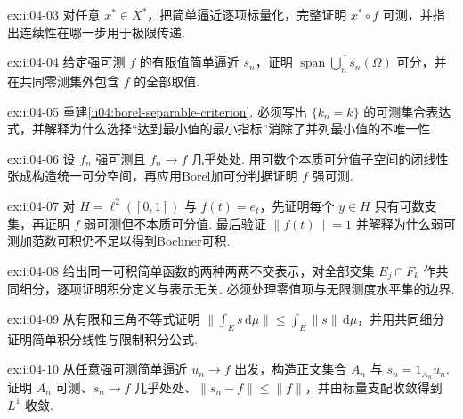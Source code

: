 \begin{FAExercise}[强可测推出弱可测]{ex:ii04-03}
对任意 \(\displaystyle x^*\in X^*\)，把简单逼近逐项标量化，完整证明 \(\displaystyle x^*\circ f\) 可测，并指出连续性在哪一步用于极限传递.
\end{FAExercise}

\begin{FAExercise}[本质可分值]{ex:ii04-04}
给定强可测 \(\displaystyle f\) 的有限值简单逼近 \(\displaystyle s_n\)，证明 \(\displaystyle\overline{\operatorname{span}\bigcup_ns_n(\Omega)}\) 可分，并在共同零测集外包含 \(\displaystyle f\) 的全部取值.
\end{FAExercise}

\begin{FAExercise}[Borel加可分判据]{ex:ii04-05}
重建\autoref{ii04:borel-separable-criterion}. 必须写出 \(\displaystyle\{k_n=k\}\) 的可测集合表达式，并解释为什么选择“达到最小值的最小指标”消除了并列最小值的不唯一性.
\end{FAExercise}

\begin{FAExercise}[强可测的几乎处处极限闭性]{ex:ii04-06}
设 \(\displaystyle f_n\) 强可测且 \(\displaystyle f_n\to f\) 几乎处处. 用可数个本质可分值子空间的闭线性张成构造统一可分空间，再应用Borel加可分判据证明 \(\displaystyle f\) 强可测.
\end{FAExercise}

\begin{FAExercise}[弱可测不推出强可测]{ex:ii04-07}
对 \(\displaystyle H=\ell^2([0,1])\) 与 \(\displaystyle f(t)=e_t\)，先证明每个 \(\displaystyle y\in H\) 只有可数支集，再证明 \(\displaystyle f\) 弱可测但不本质可分值. 最后验证 \(\displaystyle\|f(t)\|=1\) 并解释为什么弱可测加范数可积仍不足以得到Bochner可积.
\end{FAExercise}

\begin{FAExercise}[简单积分的表示无关性]{ex:ii04-08}
给出同一可积简单函数的两种两两不交表示，对全部交集 \(\displaystyle E_j\cap F_k\) 作共同细分，逐项证明积分定义与表示无关. 必须处理零值项与无限测度水平集的边界.
\end{FAExercise}

\begin{FAExercise}[简单积分范数估计]{ex:ii04-09}
从有限和三角不等式证明 \(\displaystyle\|\int_Es\,\mathrm{d}\mu\|\leqslant\int_E\|s\|\,\mathrm{d}\mu\)，并用共同细分证明简单积分线性与限制积分公式.
\end{FAExercise}

\begin{FAExercise}{ex:ii04-10}
从任意强可测简单逼近 \(\displaystyle u_n\to f\) 出发，构造正文集合 \(\displaystyle A_n\) 与 \(\displaystyle s_n=1_{A_n}u_n\). 证明 \(\displaystyle A_n\) 可测、\(\displaystyle s_n\to f\) 几乎处处、\(\displaystyle\|s_n-f\|\leqslant\|f\|\)，并由标量支配收敛得到 \(\displaystyle L^1\) 收敛.
\end{FAExercise}

